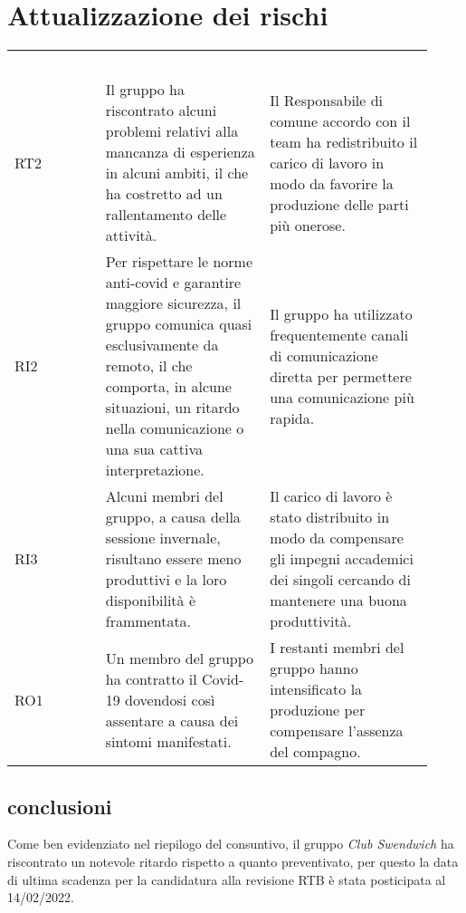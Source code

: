 \section{Attualizzazione dei rischi}
\label{sec:AttualizzazioneRischi}

{\renewcommand{\arraystretch}{1.5} \small
\begin{tabular}{ >{\centering}p{0.20\linewidth} | >{\centering}p{0.36\linewidth} | >{\centering}p{0.36\linewidth}}
	\rowcolor[RGB]{33, 73, 50}
	\textcolor{white}{\textbf{Codice}} & \textcolor{white}
	{\textbf{Descrizione}} & \textcolor{white}{\textbf{Soluzione}}\tabularnewline
	\rowcolor[RGB]{216, 235, 171}
	RT2
    & Il gruppo ha riscontrato alcuni problemi relativi alla mancanza di esperienza in alcuni ambiti, il che ha costretto ad un rallentamento delle attività.  
    & Il Responsabile di comune accordo con il team ha redistribuito il carico di lavoro in modo da favorire la produzione delle parti più onerose. \tabularnewline
    \rowcolor[RGB]{233, 245, 206}
	RI2
    & Per rispettare le norme anti-covid e garantire maggiore sicurezza, il gruppo comunica quasi esclusivamente da remoto, il che comporta, in alcune situazioni, un ritardo nella comunicazione o una sua cattiva interpretazione.
    & Il gruppo ha utilizzato frequentemente canali di comunicazione diretta per permettere una comunicazione più rapida. \tabularnewline
    \rowcolor[RGB]{216, 235, 171}
    RI3
	& Alcuni membri del gruppo, a causa della sessione invernale, risultano essere meno produttivi e la loro disponibilità è frammentata. 
    & Il carico di lavoro è stato distribuito in modo da compensare gli impegni accademici dei singoli cercando di mantenere una buona produttività. \tabularnewline
	\rowcolor[RGB]{233, 245, 206}
    RO1
	& Un membro del gruppo ha contratto il Covid-19 dovendosi così assentare a causa dei sintomi manifestati.
    & I restanti membri del gruppo hanno intensificato la produzione per compensare l'assenza del compagno.   \tabularnewline
\end{tabular}	
}

\subsection{conclusioni}
Come ben evidenziato nel riepilogo del consuntivo, il gruppo \textit{Club Swendwich} ha riscontrato un notevole ritardo rispetto a quanto preventivato, per questo la data di ultima scadenza 
per la candidatura alla revisione RTB è stata posticipata al 14/02/2022.
